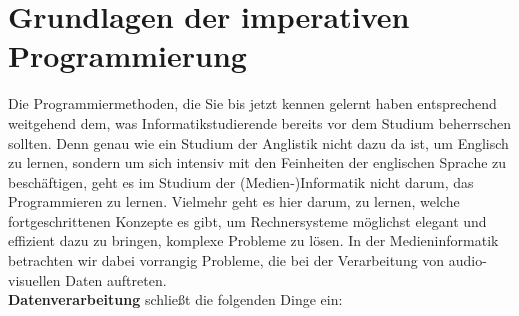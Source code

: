 \chapter{Grundlagen der imperativen Programmierung}

Die Programmiermethoden, die Sie bis jetzt kennen gelernt haben entsprechend weitgehend dem, was Informatikstudierende bereits vor dem Studium beherrschen sollten. Denn genau wie ein Studium der Anglistik nicht dazu da ist, um Englisch zu lernen, sondern um sich intensiv mit den Feinheiten der englischen Sprache zu beschäftigen, geht es im Studium der (Medien-)Informatik nicht darum, das Programmieren zu lernen. Vielmehr geht es hier darum, zu lernen, welche fortgeschrittenen Konzepte es gibt, um Rechnersysteme möglichst elegant und effizient dazu zu bringen, komplexe Probleme zu lösen. In der Medieninformatik betrachten wir dabei vorrangig Probleme, die bei der Verarbeitung von audio-visuellen Daten auftreten.\\

\textbf{Datenverarbeitung} schließt die folgenden Dinge ein: 

